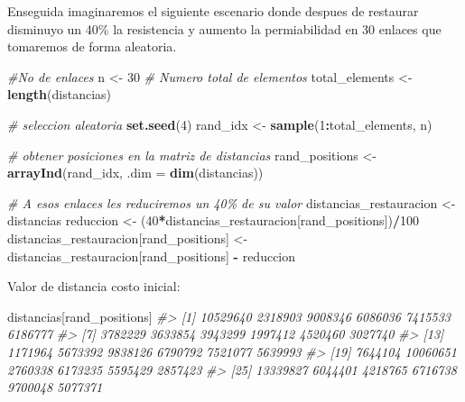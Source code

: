 \documentclass[
]{book}
\newenvironment{Shaded}{\begin{snugshade}}{\end{snugshade}}
\newcommand{\AttributeTok}[1]{\textcolor[rgb]{0.13,0.29,0.53}{#1}}
\newcommand{\CommentTok}[1]{\textcolor[rgb]{0.56,0.35,0.01}{\textit{#1}}}
\newcommand{\DecValTok}[1]{\textcolor[rgb]{0.00,0.00,0.81}{#1}}
\newcommand{\FunctionTok}[1]{\textcolor[rgb]{0.13,0.29,0.53}{\textbf{#1}}}
\newcommand{\NormalTok}[1]{#1}
\newcommand{\OtherTok}[1]{\textcolor[rgb]{0.56,0.35,0.01}{#1}}
\newcommand{\SpecialCharTok}[1]{\textcolor[rgb]{0.81,0.36,0.00}{\textbf{#1}}}
\begin{document}
Enseguida imaginaremos el siguiente escenario donde despues de restaurar disminuyo un 40\% la resistencia y aumento la permiabilidad en 30 enlaces que tomaremos de forma aleatoria.

\begin{Shaded}
\begin{Highlighting}[]
\CommentTok{\#No de enlaces}
\NormalTok{n }\OtherTok{\textless{}{-}} \DecValTok{30}
\CommentTok{\# Numero total de elementos}
\NormalTok{total\_elements }\OtherTok{\textless{}{-}} \FunctionTok{length}\NormalTok{(distancias)}

\CommentTok{\# seleccion aleatoria}
\FunctionTok{set.seed}\NormalTok{(}\DecValTok{4}\NormalTok{)}
\NormalTok{rand\_idx }\OtherTok{\textless{}{-}} \FunctionTok{sample}\NormalTok{(}\DecValTok{1}\SpecialCharTok{:}\NormalTok{total\_elements, n)}

\CommentTok{\# obtener posiciones en la matriz de distancias}
\NormalTok{rand\_positions }\OtherTok{\textless{}{-}} \FunctionTok{arrayInd}\NormalTok{(rand\_idx, }\AttributeTok{.dim =} \FunctionTok{dim}\NormalTok{(distancias))}

\CommentTok{\# A esos enlaces les reduciremos un 40\% de su valor}
\NormalTok{distancias\_restauracion }\OtherTok{\textless{}{-}}\NormalTok{ distancias}
\NormalTok{reduccion }\OtherTok{\textless{}{-}}\NormalTok{ (}\DecValTok{40}\SpecialCharTok{*}\NormalTok{distancias\_restauracion[rand\_positions])}\SpecialCharTok{/}\DecValTok{100}
\NormalTok{distancias\_restauracion[rand\_positions] }\OtherTok{\textless{}{-}}\NormalTok{ distancias\_restauracion[rand\_positions] }\SpecialCharTok{{-}}\NormalTok{ reduccion}
\end{Highlighting}
\end{Shaded}

Valor de distancia costo inicial:

\begin{Shaded}
\begin{Highlighting}[]
\NormalTok{distancias[rand\_positions]}
\CommentTok{\#\textgreater{}  [1] 10529640  2318903  9008346  6086036  7415533  6186777}
\CommentTok{\#\textgreater{}  [7]  3782229  3633854  3943299  1997412  4520460  3027740}
\CommentTok{\#\textgreater{} [13]  1171964  5673392  9838126  6790792  7521077  5639993}
\CommentTok{\#\textgreater{} [19]  7644104 10060651  2760338  6173235  5595429  2857423}
\CommentTok{\#\textgreater{} [25] 13339827  6044401  4218765  6716738  9700048  5077371}
\end{Highlighting}
\end{Shaded}
\end{document}
